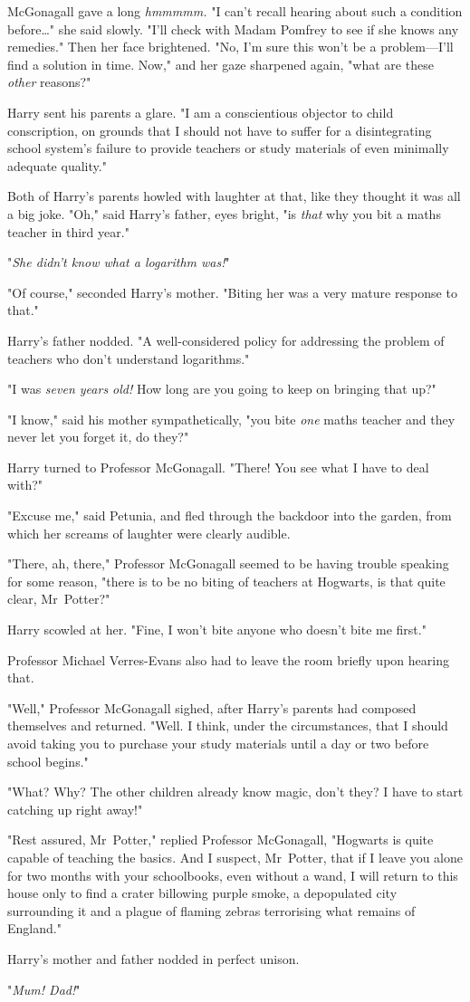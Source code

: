 McGonagall gave a long \emph{hmmmmm.} "I can't recall hearing about such a
condition before…" she said slowly. "I'll check with Madam Pomfrey to
see if she knows any remedies." Then her face brightened. "No, I'm sure this
won't be a problem---I'll find a solution in time. Now," and her gaze sharpened
again, "what are these \emph{other} reasons?"

Harry sent his parents a glare. "I am a conscientious objector to child
conscription, on grounds that I should not have to suffer for a disintegrating
school system's failure to provide teachers or study materials of even
minimally adequate quality."

Both of Harry's parents howled with laughter at that, like they thought it was
all a big joke. "Oh," said Harry's father, eyes bright, "is \emph{that} why you
bit a maths teacher in third year."

"\emph{She didn't know what a logarithm was!}"

"Of course," seconded Harry's mother. "Biting her was a very mature response to
that."

Harry's father nodded. "A well-considered policy for addressing the problem of
teachers who don't understand logarithms."

"I was \emph{seven years old!} How long are you going to keep on bringing that
up?"

"I know," said his mother sympathetically, "you bite \emph{one} maths teacher
and they never let you forget it, do they?"

Harry turned to Professor McGonagall. "There! You see what I have to deal with?"

"Excuse me," said Petunia, and fled through the backdoor into the garden, from
which her screams of laughter were clearly audible.

"There, ah, there," Professor McGonagall seemed to be having trouble speaking
for some reason, "there is to be no biting of teachers at Hogwarts, is that
quite clear, Mr~Potter?"

Harry scowled at her. "Fine, I won't bite anyone who doesn't bite me first."

Professor Michael Verres-Evans also had to leave the room briefly upon hearing
that.

"Well," Professor McGonagall sighed, after Harry's parents had composed
themselves and returned. "Well. I think, under the circumstances, that I should
avoid taking you to purchase your study materials until a day or two before
school begins."

"What? Why? The other children already know magic, don't they? I have to start
catching up right away!"

"Rest assured, Mr~Potter," replied Professor McGonagall, "Hogwarts is quite
capable of teaching the basics. And I suspect, Mr~Potter, that if I leave you
alone for two months with your schoolbooks, even without a wand, I will return
to this house only to find a crater billowing purple smoke, a depopulated city
surrounding it and a plague of flaming zebras terrorising what remains of
England."

Harry's mother and father nodded in perfect unison.

"\emph{Mum! Dad!}"
